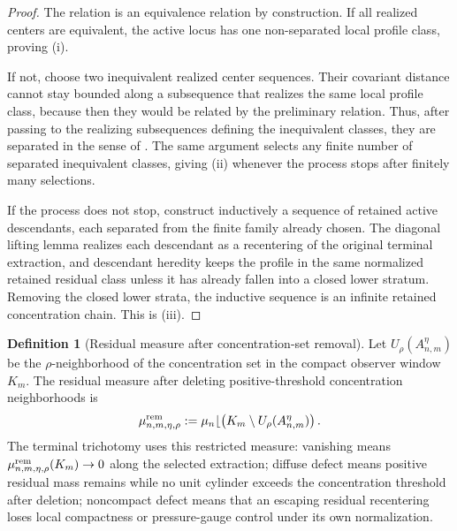 \documentclass[11pt]{amsart}
\numberwithin{equation}{section}
\theoremstyle{plain}
\theoremstyle{definition}
\newtheorem{definition}[definition]{Definition}
\theoremstyle{remark}
\begin{document}
\begin{proof}
The relation is an equivalence relation by construction.  If all realized
centers are equivalent, the active locus has one non-separated local profile
class, proving \textup{(i)}.

If not, choose two inequivalent realized center sequences.  Their covariant
distance cannot stay bounded along a subsequence that realizes the same local
profile class, because then they would be related by the preliminary relation.
Thus, after passing to the realizing subsequences defining the inequivalent
classes, they are separated in the sense of
.  The same argument selects any
finite number of separated inequivalent classes, giving \textup{(ii)} whenever
the process stops after finitely many selections.

If the process does not stop, construct inductively a sequence of retained
active descendants, each separated from the finite family already chosen.  The
diagonal lifting lemma realizes each descendant as a recentering of the
original terminal extraction, and descendant heredity keeps the profile in the
same normalized retained residual class unless it has already fallen into a
closed lower stratum.  Removing the closed lower strata, the inductive sequence
is an infinite retained concentration chain.  This is \textup{(iii)}.
\end{proof}

\begin{definition}[Residual measure after concentration-set removal]
\label{def:active-removed-residual-measure}
Let \(U_\rho(A_{n,m}^{\eta})\) be the \(\rho\)-neighborhood of the concentration set in
the compact observer window \(K_m\).  The residual measure after deleting
positive-threshold concentration neighborhoods is
\[
   \mu_{n,m,\eta,\rho}^{\rm rem}
   :=
   \mu_n\lfloor
   \left(K_m\setminus U_\rho(A_{n,m}^{\eta})\right).
\]
The terminal trichotomy uses this restricted measure:
vanishing means
\(\mu_{n,m,\eta,\rho}^{\rm rem}(K_m)\to0\) along the selected extraction;
diffuse defect means positive residual mass remains while no unit cylinder
exceeds the concentration threshold after deletion; noncompact defect means that an
escaping residual recentering loses local compactness or pressure-gauge
control under its own normalization.
\end{definition}
\end{document}
